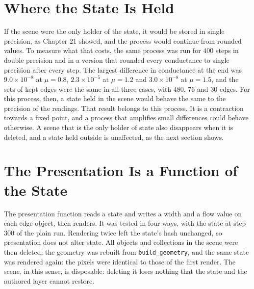 \section{Where the State Is Held}

If the scene were the only holder of the state, it would be stored in single precision, as Chapter 21 showed, and the process would continue from rounded values. To measure what that costs, the same process was run for $400$ steps in double precision and in a version that rounded every conductance to single precision after every step. The largest difference in conductance at the end was $9.0\times10^{-8}$ at $\mu=0.8$, $2.3\times10^{-5}$ at $\mu=1.2$ and $3.0\times10^{-8}$ at $\mu=1.5$, and the sets of kept edges were the same in all three cases, with $480$, $76$ and $30$ edges. For this process, then, a state held in the scene would behave the same to the precision of the readings. That result belongs to this process. It is a contraction towards a fixed point, and a process that amplifies small differences could behave otherwise. A scene that is the only holder of state also disappears when it is deleted, and a state held outside is unaffected, as the next section shows.

\section{The Presentation Is a Function of the State}

The presentation function reads a state and writes a width and a flow value on each edge object, then renders. It was tested in four ways, with the state at step $300$ of the plain run. Rendering twice left the state's hash unchanged, so presentation does not alter state. All objects and collections in the scene were then deleted, the geometry was rebuilt from \texttt{build\_geometry}, and the same state was rendered again: the pixels were identical to those of the first render. The scene, in this sense, is disposable: deleting it loses nothing that the state and the authored layer cannot restore.

